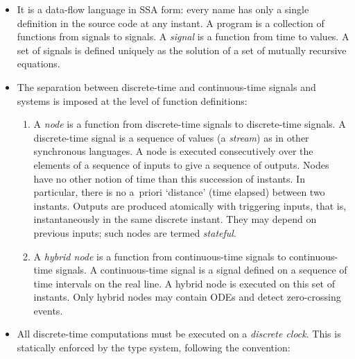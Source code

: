 \documentclass[11pt,titlepage,twoside]{report}
\newenvironment{flatitemize}
  {\begin{itemize}[leftmargin=*]}
  {\end{itemize}}
\newcommand{\zelus}{{\sf Z\'elus}}
\begin{document}
\begin{flatitemize}
\item
It is a data-flow language in \ac{SSA} form: every name has only a single 
definition in the source code at any instant. A program is a collection of 
functions from signals to signals. A \emph{signal} is a function from time
to values. A set of signals is defined uniquely as
the solution of a set of mutually recursive equations.
\item
The separation between discrete-time and continuous-time signals and
systems is imposed at the level of function definitions:
  \begin{enumerate}
  \item
    A \emph{node} is a function from discrete-time signals to
    discrete-time signals. A discrete-time signal is a sequence of values (a 
    \emph{stream}) as in other synchronous languages.
    A node is executed consecutively over the elements of a sequence of 
    inputs to give a sequence of outputs.
    Nodes have no other notion of time than this succession of instants.
    In particular, there is no a~priori `distance' (time elapsed) between 
    two instants.
    Outputs are produced atomically with triggering inputs, that is, 
    instantaneously in the same discrete instant.
    They may depend on previous inputs; such nodes are termed 
    \emph{stateful}.
  \item
    A \emph{hybrid node} is a function from continuous-time signals to
    continuous-time signals. A continuous-time signal is a signal
    defined on a sequence of time intervals on the real
    line.
    A hybrid node is executed on this set of instants. Only hybrid nodes
    may contain \acp{ODE} and detect zero-crossing events.
  \end{enumerate}
\item
All
discrete-time computations must be executed on a \emph{discrete clock}.
This is statically enforced by the type system, following the convention:


\end{flatitemize}
\end{document}
